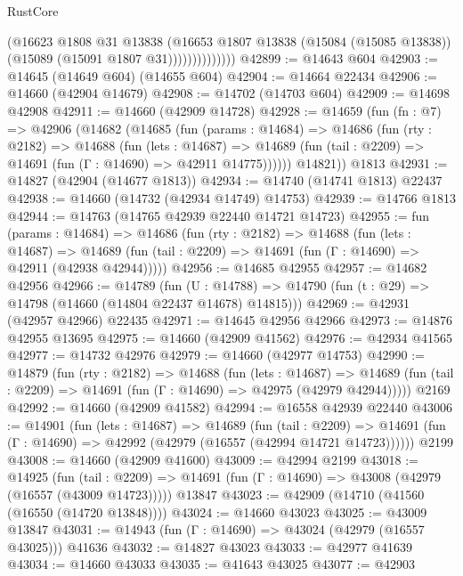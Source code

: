 \begin{lexlean}{RustCore}
\begin{coremodule}
                        (@16623
                          @1808
                          @31
                          @13838
                          (@16653
                            @1807
                            @13838
                            (@15084 (@15085 @13838))
                            (@15089 (@15091 @1807 @31))))))))))))))
@42899 := @14643 @604
@42903 := @14645 (@14649 @604) (@14655 @604)
@42904 := @14664 @22434
@42906 := @14660 (@42904 @14679)
@42908 := @14702 (@14703 @604)
@42909 := @14698 @42908
@42911 := @14660 (@42909 @14728)
@42928 := @14659
    (fun (fn : @7) =>
    @42906
      (@14682
        (@14685
          (fun (params : @14684) =>
          @14686
            (fun (rty : @2182) =>
            @14688
              (fun (lets : @14687) =>
              @14689 (fun (tail : @2209) => @14691 (fun (Γ : @14690) => @42911 @14775))))))
        @14821))
    @1813
@42931 := @14827 (@42904 (@14677 @1813))
@42934 := @14740 (@14741 @1813) @22437
@42938 := @14660 (@14732 (@42934 @14749) @14753)
@42939 := @14766 @1813
@42944 := @14763 (@14765 @42939 @22440 @14721 @14723)
@42955 := fun (params : @14684) =>
  @14686
    (fun (rty : @2182) =>
    @14688
      (fun (lets : @14687) =>
      @14689 (fun (tail : @2209) => @14691 (fun (Γ : @14690) => @42911 (@42938 @42944)))))
@42956 := @14685 @42955
@42957 := @14682 @42956
@42966 := @14789
    (fun (U : @14788) => @14790 (fun (t : @29) => @14798 (@14660 (@14804 @22437 @14678) @14815)))
@42969 := @42931 (@42957 @42966) @22435
@42971 := @14645 @42956 @42966
@42973 := @14876 @42955 @13695
@42975 := @14660 (@42909 @41562)
@42976 := @42934 @41565
@42977 := @14732 @42976
@42979 := @14660 (@42977 @14753)
@42990 := @14879
    (fun (rty : @2182) =>
    @14688
      (fun (lets : @14687) =>
      @14689 (fun (tail : @2209) => @14691 (fun (Γ : @14690) => @42975 (@42979 @42944)))))
    @2169
@42992 := @14660 (@42909 @41582)
@42994 := @16558 @42939 @22440
@43006 := @14901
    (fun (lets : @14687) =>
    @14689
      (fun (tail : @2209) =>
      @14691 (fun (Γ : @14690) => @42992 (@42979 (@16557 (@42994 @14721 @14723))))))
    @2199
@43008 := @14660 (@42909 @41600)
@43009 := @42994 @2199
@43018 := @14925
    (fun (tail : @2209) => @14691 (fun (Γ : @14690) => @43008 (@42979 (@16557 (@43009 @14723)))))
    @13847
@43023 := @42909 (@14710 (@41560 (@16550 (@14720 @13848))))
@43024 := @14660 @43023
@43025 := @43009 @13847
@43031 := @14943 (fun (Γ : @14690) => @43024 (@42979 (@16557 @43025))) @41636
@43032 := @14827 @43023
@43033 := @42977 @41639
@43034 := @14660 @43033
@43035 := @41643 @43025
@43077 := @42903

\end{coremodule}
\end{lexlean}

